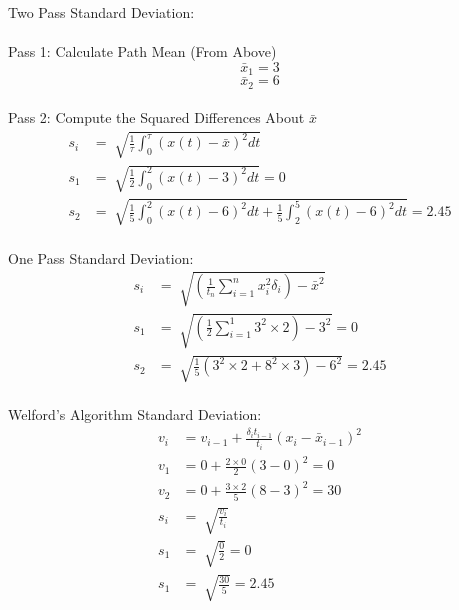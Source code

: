 \newpage

Two Pass Standard Deviation: \\\\
\indent\indent Pass 1: Calculate Path Mean (From Above)\\
$$\bar{x}_1=3$$
$$\bar{x}_2=6$$\\
\indent\indent Pass 2: Compute the Squared Differences About $\bar{x}$ \\
\begin{align*}
    s_i &= \sqrt[]{\frac{1}{\tau}\int_{0}^{\tau}(x(t)-\bar{x})^2dt}\\
    s_1 &= \sqrt[]{\frac{1}{2}\int_{0}^{2}(x(t)-3)^2dt}=0\\
    s_2 &= \sqrt[]{\frac{1}{5}\int_{0}^{2}(x(t)-6)^2dt+\frac{1}{5}\int_{2}^{5}(x(t)-6)^2dt}=2.45\\
\end{align*}

One Pass Standard Deviation: \\
\begin{align*}
    s_i &= \sqrt[]{(\frac{1}{t_n}\sum_{i=1}^{n}x_i^2\delta_i)-\bar{x}^2} \\
    s_1 &= \sqrt[]{(\frac{1}{2}\sum_{i=1}^{1}3^2\times 2)-3^2}=0\\
    s_2 &= \sqrt[]{\frac{1}{5}(3^2\times 2+8^2\times 3)-6^2}=2.45\\
\end{align*}

Welford's Algorithm Standard Deviation: \\
\begin{align*}
    v_i&=v_{i-1}+\frac{\delta_it_{i-1}}{t_i}(x_i-\bar{x}_{i-1})^2\\
    v_1&=0+\frac{2\times 0}{2}(3-0)^2=0\\
    v_2&=0+\frac{3\times 2}{5}(8-3)^2=30\\
    s_i&=\sqrt[]{\frac{v_i}{t_i}}\\
    s_1&=\sqrt[]{\frac{0}{2}}=0\\
    s_1&=\sqrt[]{\frac{30}{5}}=2.45\\
\end{align*}